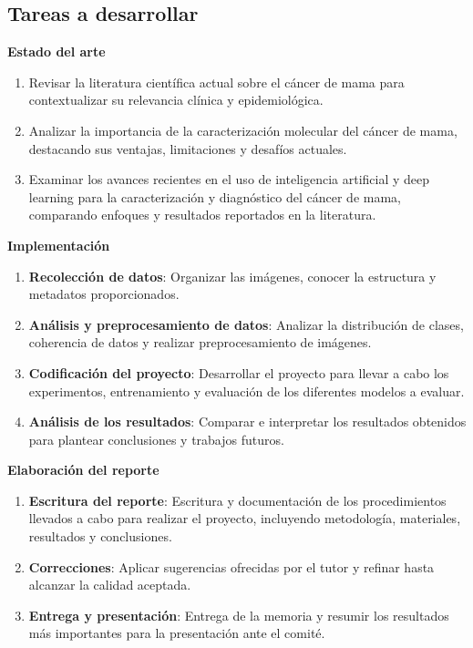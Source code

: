 \documentclass[a4paper,10pt]{book}
\begin{document}
\subsection{Tareas a desarrollar}

\textbf{Estado del arte}

\begin{enumerate}
\item Revisar la literatura científica actual sobre el cáncer de mama para contextualizar su relevancia clínica y epidemiológica.
\item Analizar la importancia de la caracterización molecular del cáncer de mama, destacando sus ventajas, limitaciones y desafíos actuales.
\item Examinar los avances recientes en el uso de inteligencia artificial y deep learning para la caracterización y diagnóstico del cáncer de mama, comparando enfoques y resultados reportados en la literatura.
\end{enumerate}

\textbf{Implementación}

\begin{enumerate}
    \item \textbf{Recolección de datos}: Organizar las imágenes, conocer la estructura y metadatos proporcionados.
    \item \textbf{Análisis y preprocesamiento de datos}: Analizar la distribución de clases, coherencia de datos y realizar preprocesamiento de imágenes.
    \item \textbf{Codificación del proyecto}: Desarrollar el proyecto para llevar a cabo los experimentos, entrenamiento y evaluación de los diferentes modelos a evaluar.
    \item \textbf{Análisis de los resultados}: Comparar e interpretar los resultados obtenidos para plantear conclusiones y trabajos futuros.
\end{enumerate}

\textbf{Elaboración del reporte}

\begin{enumerate}
    \item \textbf{Escritura del reporte}: Escritura y documentación de los procedimientos llevados a cabo para realizar el proyecto, incluyendo metodología, materiales, resultados y conclusiones.
    \item \textbf{Correcciones}: Aplicar sugerencias ofrecidas por el tutor y refinar hasta alcanzar la calidad aceptada.
    \item \textbf{Entrega y presentación}: Entrega de la memoria y resumir los resultados más importantes para la presentación ante el comité.
\end{enumerate}
\end{document}
